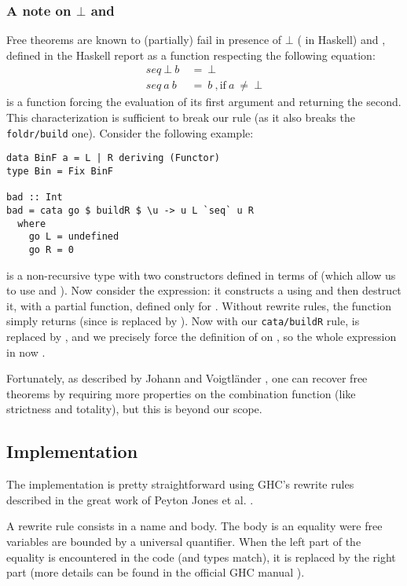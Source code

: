 \subsubsection{A note on $\bot$ and }
\label{sec:seq}
Free theorems are known to (partially) fail in presence of $\bot$ ( in Haskell) and , defined in the Haskell report \cite{haskellReport} as a function respecting the following equation:
\begin{align*}
seq\ \bot\ b\ &=\ \bot\\
seq\ a\ b\ &=\ b\ \mathrm{,if}\ a\ \neq\ \bot
\end{align*}
 is a function forcing the evaluation of its first argument and returning the second. This characterization is sufficient to break our rule (as it also breaks the \verb|foldr/build| one). Consider the following example:

\begin{verbatim}
data BinF a = L | R deriving (Functor)
type Bin = Fix BinF

bad :: Int
bad = cata go $ buildR $ \u -> u L `seq` u R
  where
    go L = undefined
    go R = 0
\end{verbatim}
 is a non-recursive type with two constructors defined in terms of  (which allow us to use  and ). Now consider the  expression: it constructs a  using  and then destruct it, with a partial function, defined only for . Without rewrite rules, the function simply returns  (since  is replaced by ). Now with our \verb|cata/buildR| rule,  is replaced by , and we precisely force the definition of  on , so the whole expression in now .

Fortunately, as described by Johann and Voigtländer \cite{JV04}, one can recover free theorems by requiring more properties on the combination function (like strictness and totality), but this is beyond our scope.

\subsection{Implementation}
The implementation is pretty straightforward using GHC's rewrite rules described in the great work of Peyton Jones et al. \cite{pbr}.

A rewrite rule consists in a name and body. The body is an equality were free variables are bounded by a universal quantifier. When the left part of the equality is encountered in the code (and types match), it is replaced by the right part (more details can be found in the official GHC manual \cite{ghc:manual}).

